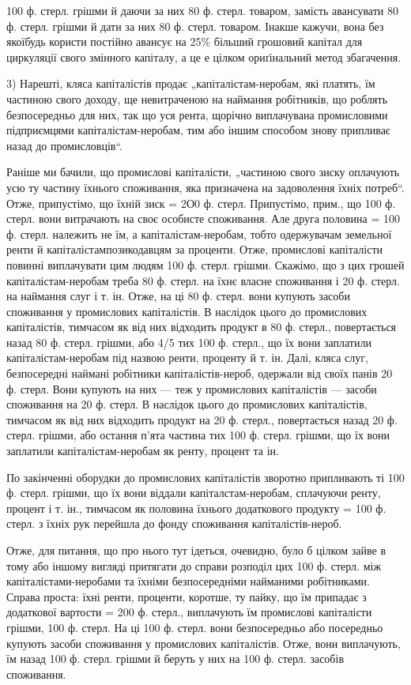 \parcont{}  %
100 ф. стерл. грішми й даючи за них 80 ф. стерл. товаром, замість авансувати 80 ф. стерл. грішми й
дати за них 80 ф. стерл. товаром. Інакше кажучи, вона без якоїбудь користи постійно авансує на 25\%
більший грошовий капітал для циркуляції свого змінного капіталу, а це е цілком ориґінальний метод
збагачення.

3) Нарешті, кляса капіталістів продає „капіталістам-неробам, які платять, їм частиною свого доходу,
ще невитраченою на наймання робітників, що роблять безпосередньо для них, так що уся рента, щорічно
виплачувана промисловими підприємцями капіталістам-неробам, тим або іншим способом знову припливає
назад до промисловців“.

Раніше ми бачили, що промислові капіталісти, „частиною свого зиску оплачують усю ту частину їхнього
споживання, яка призначена на задоволення їхніх потреб“. Отже, припустімо, що їхній зиск = 2О0 ф.
стерл. Припустімо, прим., що 100 ф. стерл. вони витрачають на своє особисте споживання. Але друга
половина = 100 ф. стерл. належить не їм, а капіталістам-неробам, тобто одержувачам земельної ренти й
капіталістампозикодавцям
за проценти. Отже, промислові капіталісти повинні виплачувати цим людям 100 ф. стерл. грішми.
Скажімо, що з цих грошей капіталістам-неробам треба 80 ф. стерл. на їхнє власне споживання і 20 ф.
стерл. на наймання слуг і т. ін. Отже, на ці 80 ф. стерл. вони купують засоби споживання у
промислових капіталістів. В наслідок цього до промислових капіталістів, тимчасом як від них
відходить продукт в 80 ф. стерл., повертається назад 80 ф. стерл. грішми, або 4/5 тих 100 ф. стерл.,
що їх вони заплатили капіталістам-неробам під назвою ренти, проценту й т. ін. Далі, кляса слуг,
безпосередні наймані робітники капіталістів-нероб, одержали від своїх панів 20 ф. стерл. Вони
купують на них — теж у промислових капіталістів — засоби споживання на 20 ф. стерл. В наслідок цього
до промислових капіталістів, тимчасом як від них відходить продукт на 20 ф. стерл., повертається
назад 20 ф. стерл. грішми, або остання п’ята частина тих 100 ф. стерл. грішми, що їх вони заплатили
капіталістам-неробам як ренту, процент та ін.

По закінченні оборудки до промислових капіталістів зворотно припливають ті 100 ф. стерл. грішми, що
їх вони віддали капіталстам-неробам, сплачуючи ренту, процент і т. ін., тимчасом як половина їхнього
додаткового продукту = 100 ф. стерл. з їхніх рук перейшла до фонду споживання капіталістів-нероб.

Отже, для питання, що про нього тут ідеться, очевидно, було б цілком зайве в тому або іншому вигляді
притягати до справи розподіл цих 100 ф. стерл. між капіталістами-неробами та їхніми безпосередніми
найманими робітниками. Справа проста: їхні ренти, проценти, коротше, ту пайку, що їм припадає з
додаткової вартости = 200 ф. стерл., виплачують їм промислові капіталісти грішми, 100 ф. стерл. На
ці 100 ф. стерл. вони безпосередньо або посередньо купують засоби споживання у промислових
капіталістів. Отже, вони виплачують, їм назад 100 ф. стерл. грішми й беруть у них на 100 ф. стерл.
засобів споживання.
